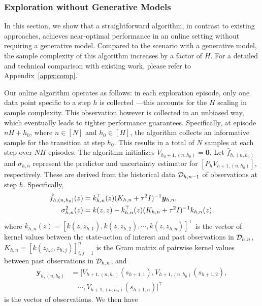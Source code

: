 \subsubsection{Exploration without Generative Models}

In this section, we show that a straightforward algorithm, in contrast to existing approaches, achieves near-optimal performance in an online setting without requiring a generative model. Compared to the scenario with a generative model, the sample complexity of this algorithm increases by a factor of $H$. For a detailed and technical comparison with existing work, please refer to Appendix~\ref{appx:comp}. %

Our online algorithm operates as follows: in each exploration episode, only one data point specific to a step $h$ is collected ---this accounts for the $H$ scaling in sample complexity. This observation however is collected in an unbiased way, which eventually leads to tighter performance guarantees. Specifically, at episode $nH+h_0$, where $n\in[N]$ and $h_0\in[H]$, the algorithm collects an informative sample for the transition at step $h_0$. This results in a total of $N$ samples at each step over $NH$ episodes. The algorithm initializes $V_{h_0+1,(n,h_0)}=\bm{0}$.
Let $\hat{f}_{h,(n,h_0)}$ and $\sigma_{h,n}$ represent the predictor and uncertainty estimator for $[P_hV_{h+1,(n,h_0)}]$, respectively. These are derived from the historical data $\mathcal{D}_{h,n-1}$ of observations at step $h$. Specifically, 
\begin{align}\nonumber
    \hat{f}_{h,(n,h_0)}(z) &= k^{\top}_{h,n}(z)(K_{h,n}+\tau^2 I)^{-1}\bm{y}_{h,n},  \\
    \sigma^2_{h,n}(z) &= k(z,z) - k^{\top}_{h,n}(z)(K_{h,n}+\tau^2 I)^{-1}k_{h,n}(z), \label{eq:mean_predictor}
\end{align}
where $k_{h,n}(z) = [k(z,z_{h,1}),k(z,z_{h,2}), \cdots, k(z,z_{h,n}) ]^{\top}$ is the vector of kernel values between the state-action of interest and past observations in $\mathcal{D}_{h,n}$, $K_{h,n}=[k(z_{h,i}, z_{h,j})]_{i,j=1}^n$ is the Gram matrix of pairwise kernel values between past observations in $\mathcal{D}_{h,n}$, and 
\begin{align*}
\bm{y}_{h,(n,h_0)} &= [V_{h+1,(n,h_0)}(s_{h+1,1}), V_{h+1,(n,h_0)}(s_{h+1,2}), \\
&\quad \cdots, V_{h+1,(n,h_0)}(s_{h+1,n}) ]^{\top}
\end{align*} 
is the vector of observations. 
We then have
